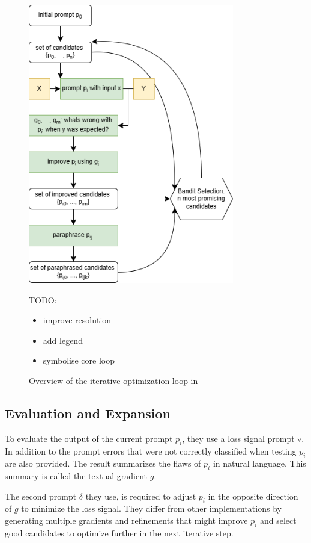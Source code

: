 \begin{figure}[h]
\centering
\includegraphics[width=9cm]{graphics/gradient_descent.png}
\caption{Overview of the iterative optimization loop in \cite{pryzant2023AutomaticPrompt}}
\label{fig:gradient_descent}
TODO: 
\begin{itemize}
    \item improve resolution
    \item add legend
    \item symbolise core loop
\end{itemize}
\end{figure}


\subsection{Evaluation and Expansion}
To evaluate the output of the current prompt $p_i$, they use a loss signal prompt $\triangledown$. In addition to the prompt errors that were not correctly classified when testing $p_i$ are also provided. The result summarizes the flaws of $p_i$ in natural language. This summary is called the textual gradient $g$.

The second prompt $\delta$ they use, is required to adjust $p_i$ in the opposite direction of $g$ to minimize the loss signal. They differ from other implementations by generating multiple gradients and refinements that might improve $p_i$ and select good candidates to optimize further in the next iterative step.

